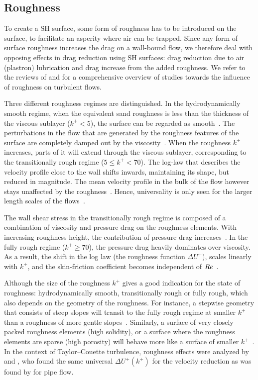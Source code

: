 \subsection{Roughness}
To create a SH surface, some form of roughness has to be introduced on the surface, to facilitate an asperity where air can be trapped. Since any form of surface roughness increases the drag on a wall-bound flow, we therefore deal with opposing effects in drag reduction using SH surfaces: drag reduction due to air (plastron) lubrication and drag increase from the added roughness. We refer to the reviews of \cite{Jimenez2004} and \cite{Flack2010} for a comprehensive overview of studies towards the influence of roughness on turbulent flows.

Three different roughness regimes are distinguished. In the hydrodynamically smooth regime, when the equivalent sand roughness is less than the thickness of the viscous sublayer ($k^+ < 5$), the surface can be regarded as smooth~\citep{Schlichting}. The perturbations in the flow that are generated by the roughness features of the surface are completely damped out by the viscosity~\citep{Flack2014}. When the roughness $k^+$ increases, parts of it will extend through the viscous sublayer, corresponding to the transitionally rough regime ($5 \leq k^+ < 70$). The log-law that describes the velocity profile close to the wall shifts inwards, maintaining its shape, but reduced in magnitude. The mean velocity profile in the bulk of the flow however stays unaffected by the roughness~\citep{Flack2014}. Hence, universality is only seen for the larger length scales of the flows~\citep{Pope}.

The wall shear stress in the transitionally rough regime is composed of a combination of viscosity and pressure drag on the roughness elements. With increasing roughness height, the contribution of pressure drag increases~\citep{Verschoof2018EPJE}. In the fully rough regime ($k^+ \geq 70$), the pressure drag heavily dominates over viscosity. As a result, the shift in the log law (the roughness function $\Delta U^+$), scales linearly with $k^+$, and the skin-friction coefficient becomes independent of $\mbox{\textit{Re}}$~\citep{Flack2014}.

Although the size of the roughness $k^+$ gives a good indication for the state of roughness: hydrodynamically smooth, transitionally rough or fully rough, which also depends on the geometry of the roughness. For instance, a stepwise geometry that consists of steep slopes will transit to the fully rough regime at smaller $k^+$ than a roughness of more gentle slopes~\citep{Busse2017}. Similarly, a surface of very closely packed roughness elements (high solidity), or a surface where the roughness elements are sparse (high porosity) will behave more like a surface of smaller $k^+$~\citep{MacDonald2016}.
In the context of Taylor--Couette turbulence, roughness effects were analyzed by \cite{Zhu2018} and \cite{Berghout2018}, who found the same universal $\Delta U^+ \left( k^+ \right)$ for the velocity reduction as was found by \cite{Nikuradse1933} for pipe flow.
